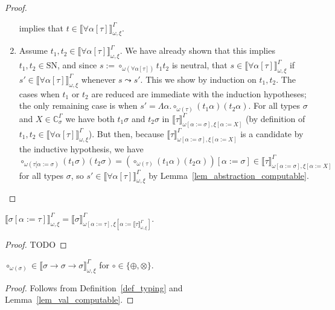\documentclass[runningheads,a4paper]{llncs}
\newcommand{\tabs}[2]{\Lambda #1.#2}
\newcommand{\subst}[2]{#1:=#2}
\newcommand{\SN}{\mathrm{SN}}
\newcommand{\Cb}{\mathbb{C}}
\newcommand{\val}[3]{\ensuremath{\llbracket#1\rrbracket_{#2}^{#3}}}
\begin{document}
\begin{proof}
\begin{enumerate}
    implies that
    $t \in \val{\forall\alpha[\tau]}{\omega,\xi}{\Gamma}$.
  \item Assume
    $t_1,t_2 \in \val{\forall\alpha[\tau]}{\omega,\xi}{\Gamma}$. We
    have already shown that this implies $t_1,t_2 \in \SN$, and since
    $s := \circ_{\omega(\forall\alpha[\tau])} t_1 t_2$ is neutral, that
    $s \in \val{\forall\alpha[\tau]}{\omega,\xi}{\Gamma}$ if $s' \in
    \val{\forall\alpha[\tau]}{\omega,\xi}{\Gamma}$ whenever $s \leadsto
    s'$.  This we show by induction on $t_1,t_2$.
    The cases when $t_1$ or $t_2$ are reduced are immediate with the
    induction hypotheses; the only remaining case is when $s' =
    \tabs{\alpha}{\circ_{\omega(\tau)} (t_1 \alpha) (t_2 \alpha)}$.
    For all types $\sigma$ and $X \in \Cb_{\sigma}^\Gamma$ we have both
    $t_1 \sigma$ and $t_2 \sigma$ in $\val{\tau}{\omega[\subst{\alpha}{
    \sigma}],\xi[\subst{\alpha}{X}]}{\Gamma}$ (by definition of
    $t_1,t_2 \in \val{\forall\alpha[\tau]}{\omega,\xi}{\Gamma}$).
    But then, because $\val{\tau}{\omega[\subst{\alpha}{\sigma}],
    \xi[\subst{\alpha}{X}]}{\Gamma}$ is a candidate by the inductive
    hypothesis, we have $\circ_{\omega(\tau[\subst{\alpha}{\sigma})}
    (t_1 \sigma) (t_2\sigma) = (\circ_{\omega(\tau)} (t_1 \alpha) (t_2
    \alpha))[\subst{\alpha}{\sigma}] \in \val{\tau}{\omega[\subst{
    \alpha}{\sigma}],\xi[\subst{\alpha}{X}]}{\Gamma}$ for all types
    $\sigma$, so $s' \in \val{\forall\alpha[\tau]}{\omega,\xi}{\Gamma}$
    by Lemma~\ref{lem_abstraction_computable}.
  \end{enumerate}
\end{proof}

\begin{lemma}\label{lem_val_subst}
  $\val{\sigma[\subst{\alpha}{\tau}]}{\omega,\xi}{\Gamma} =
  \val{\sigma}{\omega[\subst{\alpha}{\tau}],\xi[\subst{\alpha}{\val{\tau}{\omega,\xi}{\Gamma}}]}{\Gamma}$.
\end{lemma}

\begin{proof}
  TODO
\end{proof}

\begin{lemma}
  $\circ_{\omega(\sigma)} \in \val{\sigma \to \sigma \to
    \sigma}{\omega,\xi}{\Gamma}$ for
  $\circ \in \{ \oplus, \otimes \}$.
\end{lemma}

\begin{proof}
  Follows from Definition~\ref{def_typing} and
  Lemma~\ref{lem_val_computable}.
\end{proof}
\end{document}
